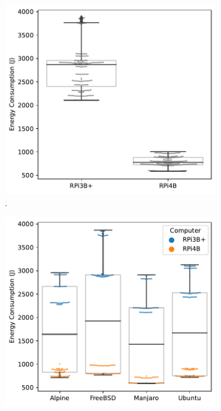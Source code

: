 
\begin{figure}[t]
\begin{subfigure}[t]{0.49\textwidth}
    \centering
    \includegraphics[width=\textwidth]{images/E_per_SUT.pdf}
    \caption{.}
    \label{fig:e_per_sut}
\end{subfigure}
\hspace{\fill}
\begin{subfigure}[t]{0.49\textwidth}
    \centering
    \includegraphics[width=\textwidth]{images/E_per_OS.pdf}

\end{subfigure}
\end{figure}

